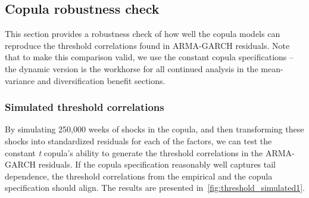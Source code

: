 \subsection{Copula robustness check}

This section provides a robustness check of how well the copula models can reproduce the threshold correlations found in ARMA-GARCH residuals. Note that to make this comparison valid, we use the constant copula specifications -- the dynamic version is the workhorse for all continued analysis in the mean-variance and diversification benefit sections.

\subsubsection{Simulated threshold correlations}

By simulating 250,000 weeks of shocks in the copula, and then transforming these shocks into standardized residuals for each of the factors, we can test the constant \textit{t} copula's ability to generate the threshold correlations in the ARMA-GARCH residuals. If the copula specification reasonably well captures tail dependence, the threshold correlations from the empirical and the copula specification should align. The results are presented in~\autoref{fig:threshold_simulated1}.

